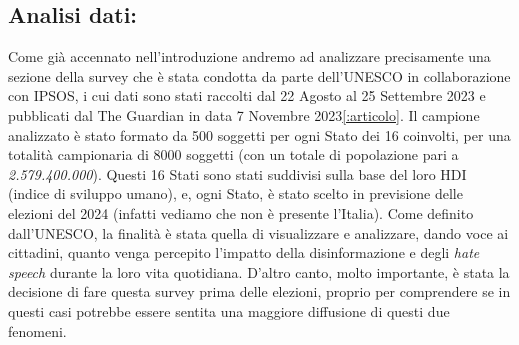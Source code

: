 \documentclass{article}
\begin{document}
\newpage\centering\subsection{Analisi dati:}

\begin{justify}    
Come già accennato nell'introduzione andremo ad analizzare precisamente una sezione della survey che è stata condotta da parte dell'UNESCO in collaborazione con IPSOS, i cui dati sono stati raccolti dal 22 Agosto al 25 Settembre 2023 e pubblicati dal The Guardian in data 7 Novembre 2023\ref{:articolo}. \citep{Unesco}
Il campione analizzato è stato formato da 500 soggetti per ogni Stato dei 16 coinvolti, per una totalità campionaria di 8000 soggetti (con un totale di popolazione pari a \textit{2.579.400.000}).
Questi 16 Stati sono stati suddivisi sulla base del loro HDI (indice di sviluppo umano), e, ogni Stato, è stato scelto in previsione delle elezioni del 2024 (infatti vediamo che non è presente l'Italia).
Come definito dall'UNESCO, la finalità è stata quella di visualizzare e analizzare, dando voce ai cittadini, quanto venga percepito l'impatto della disinformazione e degli \textit{hate speech} durante la loro vita quotidiana. D'altro canto, molto importante, è stata la decisione di fare questa survey prima delle elezioni, proprio per comprendere se in questi casi potrebbe essere sentita una maggiore diffusione di questi due fenomeni.
\end{justify}
\end{document}
